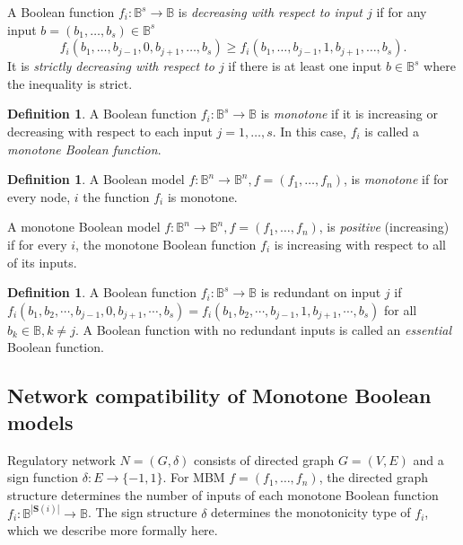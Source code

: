 \documentclass[12pt]{amsart}
\newcommand{\bbB}{\mathbb{B}}
\newcommand{\Sources}{\mathbf{S}}
\theoremstyle{definition}
\newtheorem{defn}[thm]{Definition}
\begin{document}
A Boolean function $f_i \colon \bbB^s \to \bbB$ is \emph{decreasing with respect to input $j$} if for any input $b=(b_1, \ldots, b_s) \in \bbB^s$
\[
f_i(b_1, \ldots, b_{j-1}, 0, b_{j+1}, \ldots, b_s) \geq f_i(b_1, \ldots, b_{j-1}, 1, b_{j+1}, \ldots, b_s).
\]
It is \emph{strictly decreasing with respect to $j$} if there is at least one input $b \in \bbB^s$ where the inequality is strict.


\begin{defn}
\label{defn:MBF}
A Boolean function $f_i \colon \bbB^s \to \bbB$ is \emph{monotone} if it is increasing or decreasing with respect to each input $j=1, \ldots, s$. In this case, $f_i$ is called a \emph{monotone Boolean function}.
\end{defn}

\begin{defn}\label{defn:MBM}
A Boolean model $f \colon \bbB^n \to \bbB^n, f=(f_1, \ldots, f_n)$, is \emph{monotone} if for every node, $i$ the function $f_i$ is monotone.

A monotone Boolean model $f \colon \bbB^n \to \bbB^n, f=(f_1, \ldots, f_n)$, is \emph{positive} (increasing) if for every $i$, the monotone Boolean function $f_i$ is increasing with respect to all of its inputs.
\end{defn}

\begin{defn}
    A Boolean function $f_i \colon \bbB^s \to \bbB$ is redundant on input $j$ if $f_i(b_1,b_2,\cdots, b_{j-1}, 0, b_{j+1},\cdots, b_s) = f_i(b_1,b_2,\cdots, b_{j-1}, 1, b_{j+1},\cdots, b_s)$ for all $b_k \in \bbB, k\not = j$.
    A Boolean function with no redundant inputs is called an \textit{ essential} Boolean function.
\end{defn}


\subsection{ Network compatibility of Monotone Boolean models}

Regulatory network $N=(G,
\delta)$ consists of directed graph $G=(V,E)$ and a sign function $\delta:E\to \{-1,1\}$.
For MBM $f=(f_1, \ldots, f_n)$, the directed graph structure determines the number of inputs of each monotone Boolean function $f_i:\bbB^{|\Sources(i)|} \to \bbB$. The sign structure $\delta$ determines the monotonicity type of $f_i$, which we describe more formally here.
\end{document}
